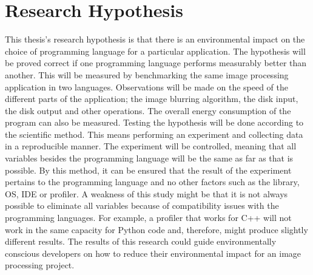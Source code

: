 \chapter{Research Hypothesis}
This thesis’s research hypothesis is that there is an environmental impact on the choice of programming language for a particular application.
The hypothesis will be proved correct if one programming language performs measurably better than another. This will be measured by benchmarking the same image processing application in two languages. Observations will be made on the speed of the different parts of the application; the image blurring algorithm, the disk input, the disk output and other operations. The overall energy consumption of the program can also be measured.
Testing the hypothesis will be done according to the scientific method. This means performing an experiment and collecting data in a reproducible manner. The experiment will be controlled, meaning that all variables besides the programming language will be the same as far as that is possible. By this method, it can be ensured that the result of the experiment pertains to the programming language and no other factors such as the library, OS, IDE or profiler.
A weakness of this study might be that it is not always possible to eliminate all variables because of compatibility issues with the programming languages. For example, a profiler that works for C++ will not work in the same capacity for Python code and, therefore, might produce slightly different results.
The results of this research could guide environmentally conscious developers on how to reduce their environmental impact for an image processing project.
